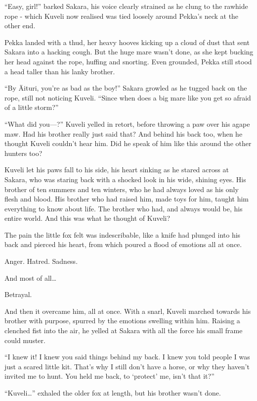 ``Easy, girl!'' barked Sakara, his voice clearly strained as he clung to the rawhide rope - which Kuveli now realised was tied loosely around Pekka's neck at the other end.

Pekka landed with a thud, her heavy hooves kicking up a cloud of dust that sent Sakara into a hacking cough. But the huge mare wasn't done, as she kept bucking her head against the rope, huffing and snorting. Even grounded, Pekka still stood a head taller than his lanky brother.

``By Äituri, you're as bad as the boy!'' Sakara growled as he tugged back on the rope, still not noticing Kuveli. ``Since when does a big mare like you get so afraid of a little storm?''

``What did you---?'' Kuveli yelled in retort, before throwing a paw over his agape maw. Had his brother really just said that? And behind his back too, when he thought Kuveli couldn't hear him. Did he speak of him like this around the other hunters too?

Kuveli let his paws fall to his side, his heart sinking as he stared across at Sakara, who was staring back with a shocked look in his wide, shining eyes. His brother of ten summers and ten winters, who he had always loved as his only flesh and blood. His brother who had raised him, made toys for him, taught him everything to know about life. The brother who had, and always would be, his entire world. And this was what he thought of Kuveli?

The pain the little fox felt was indescribable, like a knife had plunged into his back and pierced his heart, from which poured a flood of emotions all at once.

Anger. Hatred. Sadness.

And most of all\ldots{}

Betrayal.

And then it overcame him, all at once. With a snarl, Kuveli marched towards his brother with purpose, spurred by the emotions swelling within him. Raising a clenched fist into the air, he yelled at Sakara with all the force his small frame could muster.

``I knew it! I knew you said things behind my back. I knew you told people I was just a scared little kit. That's why I still don't have a horse, or why they haven't invited me to hunt. You held me back, to `protect' me, isn't that it?''

``Kuveli\ldots'' exhaled the older fox at length, but his brother wasn't done.

